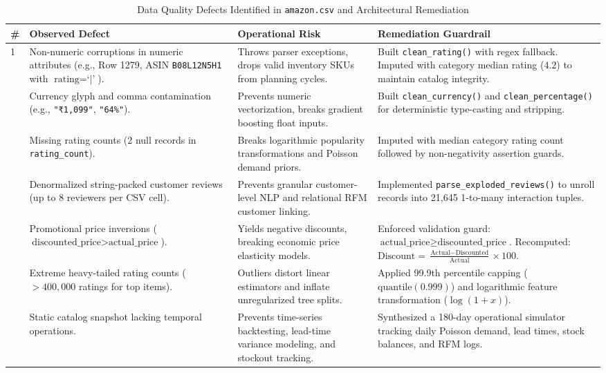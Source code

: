 \documentclass[11pt,a4paper]{article}
\begin{document}
\begin{table}[t!]
\centering
\small
\caption{Data Quality Defects Identified in \texttt{amazon.csv} and Architectural Remediation}
\label{tab:data_defects}
\vspace{0.5em}
\begin{tabularx}{\textwidth}{l p{3.2cm} p{4.2cm} X}
\toprule
\textbf{\#} & \textbf{Observed Defect} & \textbf{Operational Risk} & \textbf{Remediation Guardrail} \\
\midrule
1 & Non-numeric corruptions in numeric attributes (e.g., Row 1279, ASIN \texttt{B08L12N5H1} with $\text{rating} = \text{`|'}$). & Throws parser exceptions, drops valid inventory SKUs from planning cycles. & Built \texttt{clean\_rating()} with regex fallback. Imputed with category median rating ($4.2$) to maintain catalog integrity. \\
\addlinespace
2 & Currency glyph and comma contamination (e.g., \texttt{"₹1,099"}, \texttt{"64\%"}). & Prevents numeric vectorization, breaks gradient boosting float inputs. & Built \texttt{clean\_currency()} and \texttt{clean\_percentage()} for deterministic type-casting and stripping. \\
\addlinespace
3 & Missing rating counts (2 null records in \texttt{rating\_count}). & Breaks logarithmic popularity transformations and Poisson demand priors. & Imputed with median category rating count followed by non-negativity assertion guards. \\
\addlinespace
4 & Denormalized string-packed customer reviews (up to 8 reviewers per CSV cell). & Prevents granular customer-level NLP and relational RFM customer linking. & Implemented \texttt{parse\_exploded\_reviews()} to unroll records into 21,645 1-to-many interaction tuples. \\
\addlinespace
5 & Promotional price inversions ($\text{discounted\_price} > \text{actual\_price}$). & Yields negative discounts, breaking economic price elasticity models. & Enforced validation guard: $\text{actual\_price} \ge \text{discounted\_price}$. Recomputed: $\text{Discount} = \frac{\text{Actual} - \text{Discounted}}{\text{Actual}} \times 100$. \\
\addlinespace
6 & Extreme heavy-tailed rating counts ($>400,000$ ratings for top items). & Outliers distort linear estimators and inflate unregularized tree splits. & Applied 99.9th percentile capping ($\text{quantile}(0.999)$) and logarithmic feature transformation ($\log(1 + x)$). \\
\addlinespace
7 & Static catalog snapshot lacking temporal operations. & Prevents time-series backtesting, lead-time variance modeling, and stockout tracking. & Synthesized a 180-day operational simulator tracking daily Poisson demand, lead times, stock balances, and RFM logs. \\
\bottomrule
\end{tabularx}
\end{table}
\end{document}
